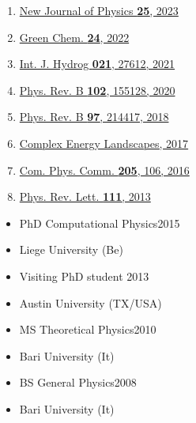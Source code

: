 \documentclass[10pt,a4paper,ragged2e,withhyper]{altacv}
\begin{document}
\begin{paracol}{2}
\begin{enumerate}
\item \href{https://iopscience.iop.org/article/10.1088/1367-2630/accca1/meta}{New Journal of Physics \textbf{25}, 2023}
\item \href{https://pubs.rsc.org/en/content/articlelanding/2022/gc/d2gc01567f/unauth}{Green Chem. \textbf{24}, 2022}
\item \href{https://www.sciencedirect.com/science/article/abs/pii/S0360319921021716?via\%3Dihub}{Int. J. Hydrog \textbf{021}, 27612, 2021}
\item \href{https://journals.aps.org/prb/abstract/10.1103/PhysRevB.102.155128}{Phys. Rev. B \textbf{102}, 155128, 2020}
\item \href{https://link.aps.org/doi/10.1103/PhysRevB.97.214417}{Phys. Rev. B \textbf{97}, 214417, 2018}
\item \href{http://www.ipam.ucla.edu/wp-content/uploads/2018/10/Energy-Landscapes-2017-White-Paper.pdf}{Complex Energy Landscapes, 2017}
\item \href{https://www.sciencedirect.com/science/article/pii/S0010465516300923}{Com. Phys. Comm. \textbf{205}, 106, 2016}
\item \href{https://link.aps.org/doi/10.1103/PhysRevLett.111.025503}{Phys. Rev. Lett. \textbf{111}, 2013}
\end{enumerate}


\begin{itemize}

\item PhD Computational Physics\hfill 2015
\item[] Liege University (Be)

\item Visiting PhD student \hfill 2013
\item[] Austin University (TX/USA)

\item MS Theoretical Physics\hfill 2010
\item[] Bari University (It) %

\item BS General Physics\hfill 2008
\item[] Bari University (It)  %


\end{itemize}
\end{paracol}
\end{document}
